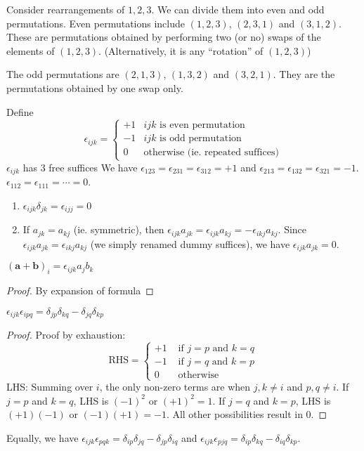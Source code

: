 \documentclass[a4paper]{article}
\begin{document}
\begin{defi}
  Consider rearrangements of $1, 2, 3$. We can divide them into even and odd permutations. Even permutations include $(1, 2, 3)$, $(2, 3, 1)$ and $(3, 1, 2)$. These are permutations obtained by performing two (or no) swaps of the elements of $(1, 2, 3)$. (Alternatively, it is any ``rotation'' of $(1, 2, 3)$)

  The odd permutations are $(2, 1, 3)$, $(1, 3, 2)$ and $(3, 2, 1)$. They are the permutations obtained by one swap only.

  Define
  \[
    \epsilon_{ijk} =
    \begin{cases}
      +1 & ijk \text{ is even permutation}\\
      -1 & ijk\text{ is odd permutation}\\
      0 & \text{otherwise (ie. repeated suffices)}
    \end{cases}
  \]
  $\epsilon_{ijk}$ has 3 free suffices
  We have $\epsilon_{123} = \epsilon_{231} = \epsilon_{312} = +1$ and $\epsilon_{213} = \epsilon_{132} = \epsilon_{321} = -1$. $\epsilon_{112} = \epsilon_{111} = \cdots = 0$.
\end{defi}
\note
\begin{enumerate}
  \item $\epsilon_{ijk}\delta_{jk} = \epsilon_{ijj} = 0$
  \item If $a_{jk} = a_{kj}$ (ie. symmetric), then $\epsilon_{ijk}a_{jk} = \epsilon_{ijk}a_{kj} = -\epsilon_{ikj}a_{kj}$. Since $\epsilon_{ijk}a_{jk} = \epsilon_{ikj}a_{kj}$ (we simply renamed dummy suffices), we have $\epsilon_{ijk}a_{jk} = 0$.
\end{enumerate}

\begin{prop}
  $(\mathbf{a} + \mathbf{b})_i = \epsilon_{ijk}a_jb_k$
\end{prop}

\begin{proof}
  By expansion of formula
\end{proof}

\begin{thm}
  $\epsilon_{ijk}\epsilon_{ipq} = \delta_{jp}\delta_{kq} - \delta_{jq}\delta_{kp}$
\end{thm}

\begin{proof}
  Proof by exhaustion:
  \[
    \text{RHS} = \begin{cases}
      +1 &\text{ if } j = p \text{ and } k = q\\
      -1 &\text{ if } j = q \text{ and } k = p\\
      0 &\text{ otherwise}
    \end{cases}
  \]
  LHS: Summing over $i$, the only non-zero terms are when $j, k\not=i$ and $p, q\not=i$. If $j = p$ and $k = q$, LHS is $(-1)^2$ or $(+1)^2 = 1$. If $j = q$ and $k = p$, LHS is $(+1)(-1)$ or $(-1)(+1) = -1$. All other possibilities result in 0.
\end{proof}
Equally, we have $\epsilon_{ijk}\epsilon_{pqk} = \delta_{ip}\delta_{jq} - \delta_{jp}\delta_{iq}$ and $\epsilon_{ijk}\epsilon_{pjq} = \delta_{ip}\delta_{kq} - \delta_{iq}\delta_{kp}$.
\end{document}
